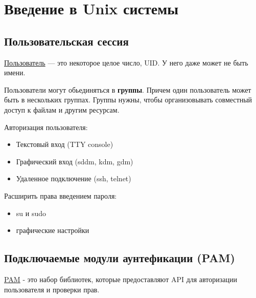 \section{Введение в Unix системы}

\subsection{Пользовательская сессия}

\begin{Def}
	\underline{Пользователь} --- это некоторое целое число, UID. У него даже может не быть имени.
\end{Def}

Пользователи могут обьединяться в \textbf{группы}. Причем один пользователь может быть в нескольких группах. Группы нужны, чтобы организовывать совместный доступ к файлам и другим ресурсам.

Авторизация пользователя:
\begin{itemize}
	\item Текстовый вход (TTY console)
    \item Графический вход (sddm, kdm, gdm)
    \item Удаленное подключение (ssh, telnet)
\end{itemize}


Расширить права введением пароля:
\begin{itemize}
	\item su и sudo
	\item графические настройки
\end{itemize}


\subsection{Подключаемые модули аунтефикации (PAM)}

\begin{Def}
	\underline{PAM} - это набор библиотек, которые предоставляют API для авторизации пользователя и
	проверки прав.
\end{Def}


